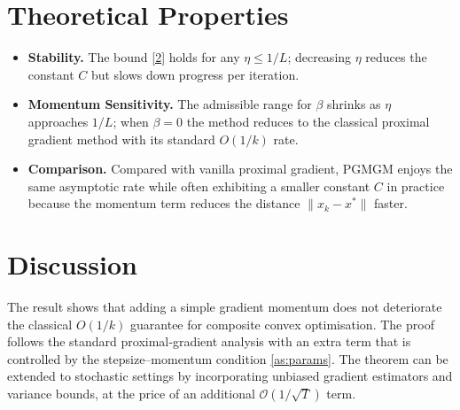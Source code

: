 \documentclass{article}
\begin{document}
\section*{Theoretical Properties}
\begin{itemize}
    \item \textbf{Stability.} The bound \eqref{2} holds for any $\eta\le1/L$; decreasing $\eta$ reduces the constant $C$ but slows down progress per iteration.
    \item \textbf{Momentum Sensitivity.} The admissible range for $\beta$ shrinks as $\eta$ approaches $1/L$; when $\beta=0$ the method reduces to the classical proximal gradient method with its standard $O(1/k)$ rate.
    \item \textbf{Comparison.} Compared with vanilla proximal gradient, PGMGM enjoys the same asymptotic rate while often exhibiting a smaller constant $C$ in practice because the momentum term reduces the distance $\|x_{k}-x^{*}\|$ faster.
\end{itemize}

\section*{Discussion}
The result shows that adding a simple gradient momentum does not deteriorate the classical $O(1/k)$ guarantee for composite convex optimisation. The proof follows the standard proximal‑gradient analysis with an extra term that is controlled by the stepsize–momentum condition \eqref{as:params}. The theorem can be extended to stochastic settings by incorporating unbiased gradient estimators and variance bounds, at the price of an additional $\mathcal{O}(1/\sqrt{T})$ term.
\end{document}
